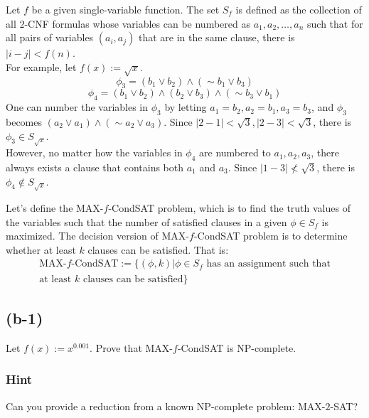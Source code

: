 Let $f$ be a given single-variable function. The set $S_f$ is defined as the collection of all $2$-CNF formulas whose variables can be numbered as $a_1, a_2, \dots, a_n$ such that for all pairs of variables $(a_i, a_j)$ that are in the same clause, there is $|i-j|<f(n)$.\\
For example, let $f(x):=\sqrt x$.
$$\phi_3=(b_1\lor b_2)\land(\sim b_1\lor b_3)$$
$$\phi_4=(b_1\lor b_2)\land(b_2\lor b_3)\land(\sim b_3\lor b_1)$$
One can number the variables in $\phi_3$ by letting $a_1=b_2, a_2=b_1, a_3=b_3$, and $\phi_3$ becomes $(a_2\lor a_1)\land(\sim a_2\lor a_3)$. Since $|2-1|<\sqrt3, |2-3|<\sqrt3$, there is $\phi_3\in S_{\sqrt x}$.\\
However, no matter how the variables in $\phi_4$ are numbered to $a_1, a_2, a_3$, there always exists a clause that contains both $a_1$ and $a_3$. Since $|1-3|\not<\sqrt3$, there is $\phi_4\notin S_{\sqrt x}$.

Let's define the MAX-$f$-CondSAT problem, which is to find the truth values of the variables such that the number of satisfied clauses in a given $\phi\in S_f$ is maximized. The decision version of MAX-$f$-CondSAT problem is to determine whether at least $k$ clauses can be satisfied. That is:
\begin{gather*}
\text{MAX-}f\text{-CondSAT}:=\{(\phi, k)|\phi\in S_f\text{ has an assignment such that}\\
\text{at least }k\text{ clauses can be satisfied}\}
\end{gather*}


\subsection*{(b-1)}

Let $f(x):=x^{0.001}$. Prove that MAX-$f$-CondSAT is NP-complete.

\subsubsection*{Hint}

Can you provide a reduction from a known NP-complete problem: MAX-$2$-SAT?

